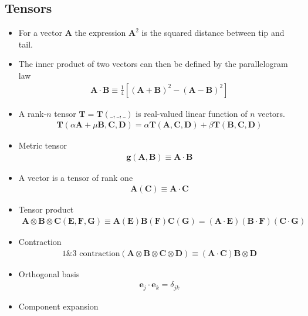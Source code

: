 \documentclass[10pt,a4paper]{book}
\theoremstyle{definition}
\begin{document}
\subsection{Tensors}
\begin{itemize}
\item For a vector $\mathbf{A}$ the expression $\mathbf{A}^2$ is the squared distance between tip and tail.
\item The inner product of two vectors can then be defined by the parallelogram law
\begin{align}
    \mathbf{A}\cdot\mathbf{B}\equiv\frac{1}{4}\left[(\mathbf{A}+\mathbf{B})^2-(\mathbf{A}-\mathbf{B})^2\right]
\end{align}
\item A rank-$n$ tensor $\mathbf{T}=\mathbf{T}(\_,\_,\_)$ is real-valued linear function of $n$ vectors.
\begin{align}
    \mathbf{T}(\alpha\mathbf{A}+\mu\mathbf{B},\mathbf{C},\mathbf{D})=\alpha\mathbf{T}(\mathbf{A},\mathbf{C},\mathbf{D})+\beta\mathbf{T}(\mathbf{B},\mathbf{C},\mathbf{D})
\end{align}
\item Metric tensor
\begin{align}
    \mathbf{g}(\mathbf{A},\mathbf{B})\equiv\mathbf{A}\cdot\mathbf{B}
\end{align}
\item A vector is a tensor of rank one 
\begin{align}
    \mathbf{A}(\mathbf{C})\equiv\mathbf{A}\cdot\mathbf{C}
\end{align}
\item Tensor product 
\begin{align}
    \mathbf{A}\otimes\mathbf{B}\otimes\mathbf{C}(\mathbf{E},\mathbf{F},\mathbf{G})\equiv\mathbf{A}(\mathbf{E})\mathbf{B}(\mathbf{F})\mathbf{C}(\mathbf{G})=(\mathbf{A}\cdot\mathbf{E})(\mathbf{B}\cdot\mathbf{F})(\mathbf{C}\cdot\mathbf{G})
\end{align}
\item Contraction
\begin{align}
    \text{1\&3 contraction}(\mathbf{A}\otimes\mathbf{B}\otimes\mathbf{C}\otimes\mathbf{D})\equiv(\mathbf{A}\cdot\mathbf{C})\mathbf{B}\otimes\mathbf{D}
\end{align}
\item Orthogonal basis
\begin{align}
    \mathbf{e}_j\cdot\mathbf{e}_k=\delta_{jk}
\end{align}
\item Component expansion

\end{itemize}
\end{document}
